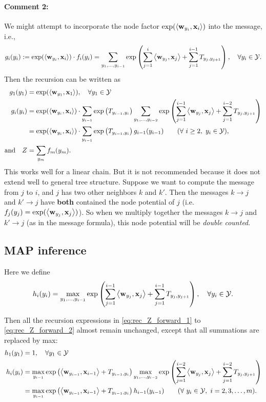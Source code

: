 \documentclass[11pt]{report}
\begin{document}
	\paragraph{Comment 2:}
	We might attempt to incorporate the node factor $\exp(\left\langle \mathbf{\boldsymbol{w}}_{y_i},\mathbf{\boldsymbol{x}}_i \right\rangle)$ into the message, i.e.,
	\begin{align}
		g_i(y_i) := \exp(\left\langle \mathbf{\boldsymbol{w}}_{y_i},\mathbf{\boldsymbol{x}}_i \right\rangle) \cdot f_i(y_i) = \sum_{y_1, \ldots, y_{i-1}} \exp \left(\sum_{j=1}^{i} \left\langle \mathbf{\boldsymbol{w}}_{y_j},\mathbf{\boldsymbol{x}}_j \right\rangle + \sum_{j=1}^{i-1} T_{y_j, y_{j+1}}\right), \quad \forall y_i \in \mathcal{Y}.
	\end{align}
	Then the recursion can be written as
	\begin{align}
		g_1(y_1) &= \exp(\left\langle \mathbf{\boldsymbol{w}}_{y_1},\mathbf{\boldsymbol{x}}_1 \right\rangle), \quad \forall y_1 \in \mathcal{Y} \\
		g_i(y_i) &= \exp(\left\langle \mathbf{\boldsymbol{w}}_{y_i},\mathbf{\boldsymbol{x}}_i \right\rangle) \cdot \sum_{y_{i-1}} \exp \left(T_{y_{i-1}, y_i}\right)
		\sum_{y_1, \ldots, y_{i-2}} \exp \left(\sum_{j=1}^{i-1} \left\langle \mathbf{\boldsymbol{w}}_{y_j},\mathbf{\boldsymbol{x}}_j \right\rangle + \sum_{j=1}^{i-2} T_{y_j, y_{j+1}}\right) \\
		&= \exp(\left\langle \mathbf{\boldsymbol{w}}_{y_i},\mathbf{\boldsymbol{x}}_i \right\rangle) \cdot \sum_{y_{i-1}} \exp \left(T_{y_{i-1}, y_i}\right)  g_{i-1}(y_{i-1})  \qquad (\forall\ i \ge 2, \ y_i \in \mathcal{Y}), \\
		\text{and} \quad Z &= \sum_{y_m} f_m(y_m).
	\end{align}
	This works well for a linear chain.
	But it is not recommended because it does not extend well to general tree structure.
	Suppose we want to compute the message from $j$ to $i$, and $j$ has two other neighbors $k$ and $k'$.
	Then the messages $k \to j$ and $k' \to j$ have \textbf{both} contained the node potential of $j$ (i.e. $f_j(y_j) = \exp (\left\langle \mathbf{\boldsymbol{w}}_{y_j},\mathbf{\boldsymbol{x}}_j \right\rangle)$).
	So when we multiply together the messages $k \to j$ and $k' \to j$ (as in the message formula),
	this node potential will be \emph{double counted}.
	
	\subsection{MAP inference}
	\label{sec:MAP_formula}
	Here we define
	\begin{align}
		h_i(y_i) = \max_{y_1, \ldots, y_{i-1}} \exp \left(\sum_{j=1}^{i-1} \left\langle \mathbf{\boldsymbol{w}}_{y_j},\mathbf{\boldsymbol{x}}_j \right\rangle + \sum_{j=1}^{i-1} T_{y_j, y_{j+1}}\right), \quad \forall y_i \in \mathcal{Y}.
	\end{align}
	
	Then all the recursion expressions in \eqref{eq:rec_Z_forward_1}	to \eqref{eq:rec_Z_forward_2} almost remain unchanged,
	except that all summations are replaced by max:
	\begin{align}
		\label{eq:rec_MAP_forward_1}
		h_1(y_1) &= 1, \quad \forall y_1 \in \mathcal{Y} \\
		h_i(y_i) &= \max_{y_{i-1}} \exp \left(\left\langle \mathbf{\boldsymbol{w}}_{y_{i-1}},\mathbf{\boldsymbol{x}}_{i-1} \right\rangle + T_{y_{i-1}, y_i}\right)
		\max_{y_1, \ldots, y_{i-2}} \exp \left(\sum_{j=1}^{i-2} \left\langle \mathbf{\boldsymbol{w}}_{y_j},\mathbf{\boldsymbol{x}}_j \right\rangle + \sum_{j=1}^{i-2} T_{y_j, y_{j+1}}\right) \\
		\label{eq:rec_MAP_forward_2}	
		&= \max_{y_{i-1}} \exp \left(\left\langle \mathbf{\boldsymbol{w}}_{y_{i-1}},\mathbf{\boldsymbol{x}}_{i-1} \right\rangle + T_{y_{i-1}, y_i}\right)  h_{i-1}(y_{i-1})  \qquad (\forall\ y_i \in \mathcal{Y}, \ i = 2, 3, \ldots, m).
	\end{align}
	
\end{document}
